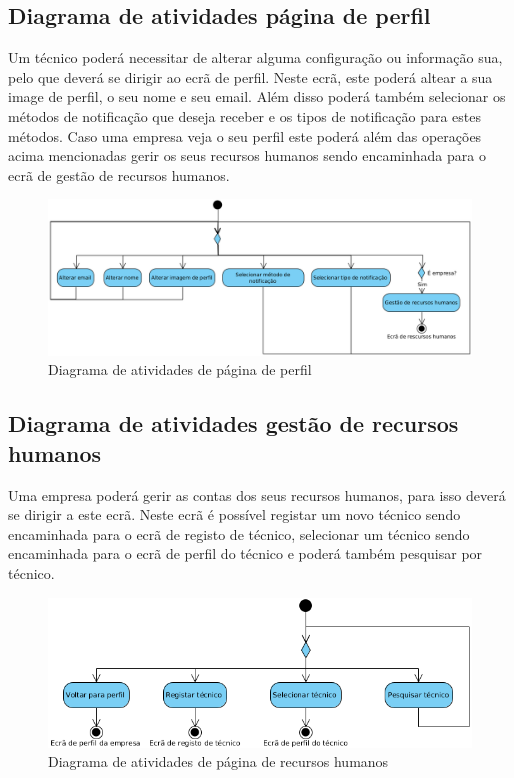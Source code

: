 \subsection{Diagrama de atividades página de perfil}

Um técnico poderá necessitar de alterar alguma configuração ou informação sua, pelo que deverá se dirigir
ao ecrã de perfil. Neste ecrã, este poderá altear a sua image de perfil, o seu nome e seu email. 
Além disso poderá também selecionar os métodos de notificação que deseja receber e os tipos de notificação
para estes métodos. Caso uma empresa veja o seu perfil este poderá além das operações acima mencionadas
gerir os seus recursos humanos sendo encaminhada para o ecrã de gestão de recursos humanos.

\begin{figure}[htb]
    \centering
    \includegraphics[width=\textwidth]{images/diagramas/atividades/diagrama_atividades_perfil.png}
    \caption{Diagrama de atividades de página de perfil}
    \label{fig:28}
\end{figure}

\newpage

\subsection{Diagrama de atividades gestão de recursos humanos}

Uma empresa poderá gerir as contas dos seus recursos humanos, para isso deverá se dirigir a este ecrã.
Neste ecrã é possível registar um novo técnico sendo encaminhada para o ecrã de registo de técnico, 
selecionar um técnico sendo encaminhada para o ecrã de perfil do técnico e poderá também pesquisar por 
técnico.

\begin{figure}[htb]
    \centering
    \includegraphics[width=\textwidth]{images/diagramas/atividades/diagrama_atividades_human_resources.png}
    \caption{Diagrama de atividades de página de recursos humanos}
    \label{fig:29}
\end{figure}


